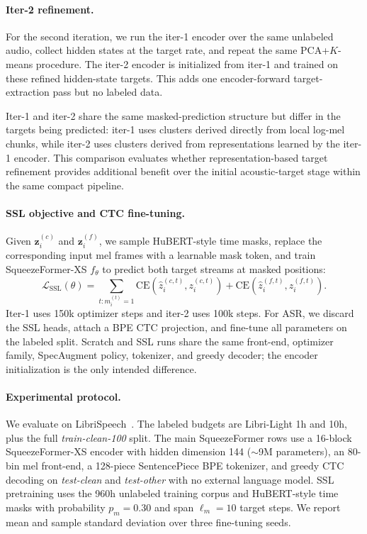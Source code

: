 \documentclass{article}
\begin{document}
\paragraph{Iter-2 refinement.}
For the second iteration, we run the iter-1 encoder over the same
unlabeled audio, collect hidden states at the target rate, and repeat the
same PCA+$K$-means procedure. The iter-2 encoder is initialized from
iter-1 and trained on these refined hidden-state targets. This adds one
encoder-forward target-extraction pass but no labeled data.

Iter-1 and iter-2 share the same masked-prediction structure but differ
in the targets being predicted: iter-1 uses clusters derived directly
from local log-mel chunks, while iter-2 uses clusters derived from
representations learned by the iter-1 encoder. This comparison evaluates
whether representation-based target refinement provides additional
benefit over the initial acoustic-target stage within the same compact
pipeline.

\paragraph{SSL objective and CTC fine-tuning.}
Given $\mathbf z_i^{(c)}$ and $\mathbf z_i^{(f)}$, we sample HuBERT-style
time masks, replace the corresponding input mel frames with a learnable
mask token, and train SqueezeFormer-XS $f_\theta$ to predict both target
streams at masked positions:
\begin{equation}
  \mathcal{L}_{\mathrm{SSL}}(\theta)=
  \sum_{t:m_i^{(t)}=1}
    \mathrm{CE}(\hat z_i^{(c,t)},z_i^{(c,t)})
    +\mathrm{CE}(\hat z_i^{(f,t)},z_i^{(f,t)}).
  \label{eq:ssl-loss}
\end{equation}
Iter-1 uses 150k optimizer steps and iter-2 uses 100k steps. For ASR, we
discard the SSL heads, attach a BPE CTC projection, and fine-tune all
parameters on the labeled split. Scratch and SSL runs share the same
front-end, optimizer family, SpecAugment policy, tokenizer, and greedy
decoder; the encoder initialization is the only intended difference.

\paragraph{Experimental protocol.}
We evaluate on LibriSpeech~\citep{librispeech}. The labeled budgets are
Libri-Light 1h and 10h, plus the full \textit{train-clean-100} split.
The main SqueezeFormer rows use a 16-block SqueezeFormer-XS encoder with
hidden dimension 144 ($\sim$9M parameters), an 80-bin mel front-end, a
128-piece SentencePiece BPE tokenizer, and greedy CTC decoding on
\textit{test-clean} and \textit{test-other} with no external language
model. SSL pretraining uses the 960h unlabeled training corpus and
HuBERT-style time masks with probability $p_m{=}0.30$ and span
$\ell_m{=}10$ target steps. We report mean and sample standard deviation
over three fine-tuning seeds.
\end{document}

